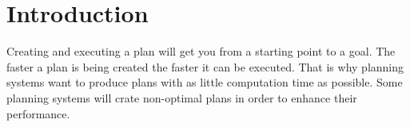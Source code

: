 \chapter{Introduction}





Creating and executing a plan will get you from a starting point to a goal.
The faster a plan is being created the faster it can be executed.
That is why planning systems want to produce plans with as little computation time as possible.
Some planning systems will crate non-optimal plans in order to enhance their performance.

